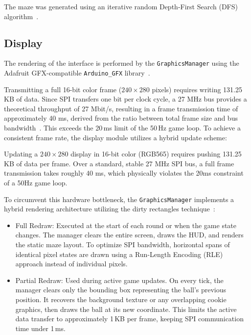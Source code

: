 The maze was generated using an iterative random Depth-First Search (DFS) algorithm~\cite{maze2026dfs}.

\subsection{Display}
\label{subsec:display}

The rendering of the interface is performed by the \texttt{GraphicsManager} using the Adafruit GFX-compatible \texttt{Arduino\_GFX} library~\cite{arduino2026gfx}.

Transmitting a full 16-bit color frame ($240 \times 280$ pixels) requires writing 131.25 KB of data. Since SPI transfers one bit per clock cycle, a 27 MHz bus provides a theoretical throughput of 27 Mbit/s, resulting in a frame transmission time of approximately 40 ms, derived from the ratio between total frame size and bus bandwidth~\cite{computools2026spi}.
This exceeds the 20\,ms limit of the 50\,Hz game loop.
To achieve a consistent frame rate, the display module utilizes a hybrid update scheme:

Updating a $240 \times 280$ display in 16-bit color (RGB565) requires pushing 131.25 KB of data per frame. Over a standard, stable 27 MHz SPI bus, a full frame transmission takes roughly 40 ms, which physically violates the 20ms constraint of a 50Hz game loop.

To circumvent this hardware bottleneck, the \texttt{GraphicsManager} implements a hybrid rendering architecture utilizing the dirty rectangles technique~\cite{studyraid2025dirtyrect}:

\begin{itemize}
    \item Full Redraw: Executed at the start of each round or when the game state changes. The manager clears the entire screen, draws the HUD, and renders the static maze layout. To optimize SPI bandwidth, horizontal spans of identical pixel states are drawn using a Run-Length Encoding (RLE)~\cite{peterson2023computer} approach instead of individual pixels.
    \item Partial Redraw: Used during active game updates. On every tick, the manager clears only the bounding box representing the ball's previous position. It recovers the background texture or any overlapping cookie graphics, then draws the ball at its new coordinate. This limits the active data transfer to approximately 1\,KB per frame, keeping SPI communication time under 1\,ms.
\end{itemize}

